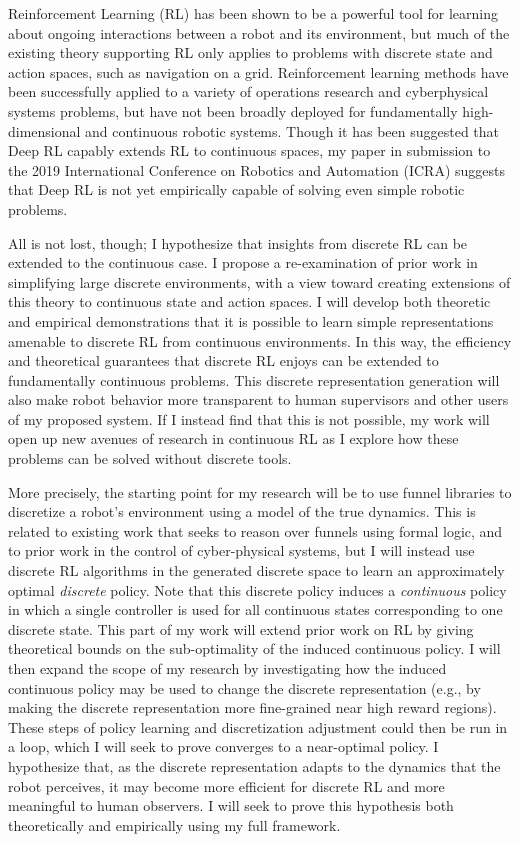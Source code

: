 \documentclass[10pt]{article}
\begin{document}
Reinforcement Learning (RL) has been shown to be a powerful tool for learning
about ongoing interactions between a robot and its
environment, but much of the existing theory
supporting RL only applies to problems with discrete state and action
spaces, such as navigation on a grid.
Reinforcement learning methods have been successfully applied to a variety of
operations research and cyberphysical systems problems,
but have not been broadly deployed for fundamentally high-dimensional and
continuous robotic systems. Though it has been suggested that Deep RL capably
extends RL to continuous spaces, my paper in submission to the 2019
International Conference on Robotics and Automation (ICRA) suggests that Deep RL
is not yet empirically capable of solving even simple robotic problems. 

All is not lost, though; I hypothesize that insights from discrete RL can be
extended to the continuous case. I propose a re-examination of prior work in
simplifying large discrete environments, with a view toward
creating extensions of this theory to continuous state and action spaces. I will
develop both theoretic and empirical demonstrations that it is possible to learn
simple representations amenable to discrete RL from continuous environments. In
this way, the efficiency and theoretical guarantees that discrete RL enjoys can
be extended to fundamentally continuous problems. This discrete representation
generation will also make robot behavior more transparent to human supervisors
and other users of my proposed system. If I instead find that this is not
possible, my work will open up new avenues of research in continuous RL as I
explore how these problems can be solved without discrete tools.

More precisely, the starting point for my research will be to use funnel
libraries to discretize a robot's environment using a
  model of the true dynamics. This is related to existing work that
seeks to reason over funnels using formal logic,
and to prior work in the control of cyber-physical
systems, but I will instead use discrete RL
algorithms in the generated discrete space to learn an approximately optimal
\emph{discrete} policy. Note that this discrete policy induces a
\emph{continuous} policy in which a single controller is used for all
continuous states corresponding to one discrete state. This part of my work will
extend prior work on RL by giving theoretical bounds on the sub-optimality of
the induced continuous policy. I will then expand the scope of my research by
investigating how the induced continuous policy may be used to change the
discrete representation (e.g., by making the discrete representation more
fine-grained near high reward regions). These steps of policy learning and
discretization adjustment could then be run in a loop, which I will seek to
prove converges to a near-optimal policy. I hypothesize that, as the discrete
representation adapts to the dynamics that the robot perceives, it may become
more efficient for discrete RL and more meaningful to human observers. I will
seek to prove this hypothesis both theoretically and empirically using my full
framework.
\end{document}
